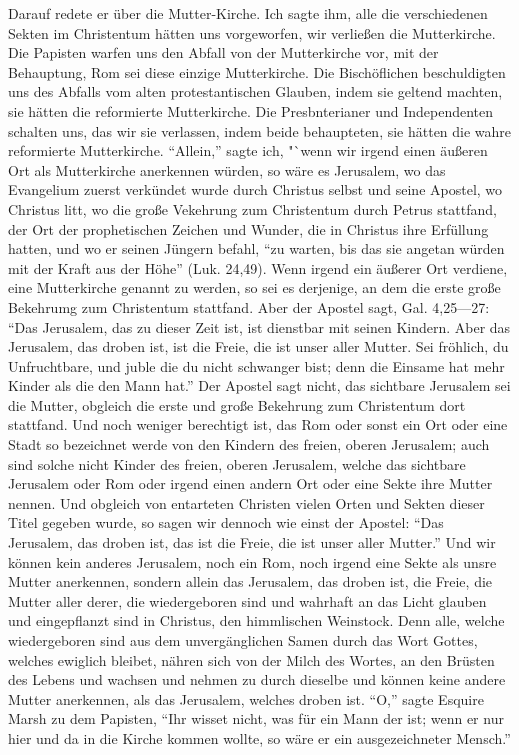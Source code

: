 Darauf redete er über die Mutter-Kirche. Ich sagte ihm,
alle die verschiedenen Sekten im Christentum hätten uns 
vorgeworfen, wir verließen die Mutterkirche. Die Papisten warfen
uns den Abfall von der Mutterkirche vor, mit der Behauptung,
Rom sei diese einzige Mutterkirche. Die Bischöflichen beschuldigten
uns des Abfalls vom alten protestantischen Glauben, indem sie
geltend machten, sie hätten die reformierte Mutterkirche. Die
Presbnterianer und Independenten schalten uns, das wir sie 
verlassen, indem beide behaupteten, sie hätten die wahre reformierte
Mutterkirche. "`Allein,"' sagte ich, "`wenn wir irgend einen äußeren
Ort als Mutterkirche anerkennen würden, so wäre es Jerusalem,
wo das Evangelium zuerst verkündet wurde durch Christus selbst
und seine Apostel, wo Christus litt, wo die große Vekehrung
zum Christentum durch Petrus stattfand, der Ort der prophetischen
Zeichen und Wunder, die in Christus ihre Erfüllung hatten, und
wo er seinen Jüngern befahl, "`zu warten, bis das sie angetan
würden mit der Kraft aus der Höhe"' (Luk. 24,49). 
Wenn irgend ein äußerer Ort verdiene, eine Mutterkirche genannt zu werden, 
so sei es derjenige, an dem die erste große Bekehrumg zum Christentum 
stattfand. Aber der Apostel sagt, 
Gal. 4,25—27: "`Das
Jerusalem, das zu dieser Zeit ist, ist dienstbar mit seinen Kindern.
Aber das Jerusalem, das droben ist, ist die Freie, die ist unser
aller Mutter. Sei fröhlich, du Unfruchtbare, und juble die du
nicht schwanger bist; denn die Einsame hat mehr Kinder als
die den Mann hat."' Der Apostel sagt nicht, das sichtbare
Jerusalem sei die Mutter, obgleich die erste und große Bekehrung
zum Christentum dort stattfand. Und noch weniger berechtigt ist, das
Rom oder sonst ein Ort oder eine Stadt so bezeichnet werde von
den Kindern des freien, oberen Jerusalem; auch sind solche nicht
Kinder des freien, oberen Jerusalem, welche das sichtbare Jerusalem 
oder Rom oder irgend einen andern Ort oder eine Sekte
ihre Mutter nennen. Und obgleich von entarteten Christen vielen
Orten und Sekten dieser Titel gegeben wurde, so sagen wir
dennoch wie einst der Apostel: "`Das Jerusalem, das droben ist,
das ist die Freie, die ist unser aller Mutter."' Und wir können
kein anderes Jerusalem, noch ein Rom, noch irgend eine Sekte
als unsre Mutter anerkennen, sondern allein das Jerusalem, das
droben ist, die Freie, die Mutter aller derer, die wiedergeboren
sind und wahrhaft an das Licht glauben und eingepflanzt sind
in Christus, den himmlischen Weinstock. Denn alle, welche 
wiedergeboren sind aus dem unvergänglichen Samen durch das Wort
Gottes, welches ewiglich bleibet, nähren sich von der Milch des
Wortes, an den Brüsten des Lebens und wachsen und nehmen
zu durch dieselbe und können keine andere Mutter anerkennen,
als das Jerusalem, welches droben ist. "`O,"' sagte Esquire
Marsh zu dem Papisten, "`Ihr wisset nicht, was für ein Mann
der ist; wenn er nur hier und da in die Kirche kommen wollte,
so wäre er ein ausgezeichneter Mensch."'

